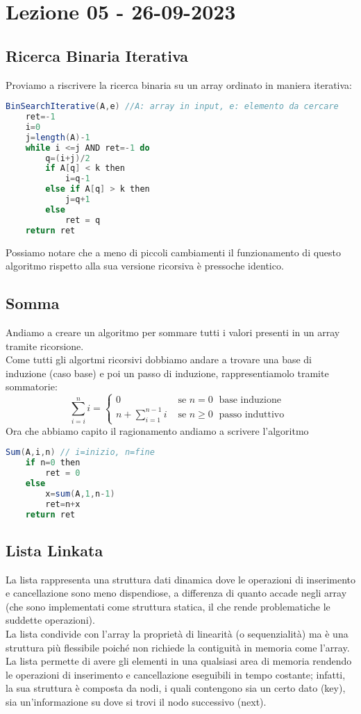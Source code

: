 \section{Lezione 05 - 26-09-2023}

\subsection{Ricerca Binaria Iterativa}
Proviamo a riscrivere la ricerca binaria su un array ordinato in maniera iterativa:
\begin{lstlisting}[language=Java]
BinSearchIterative(A,e) //A: array in input, e: elemento da cercare
	ret=-1
	i=0
	j=length(A)-1
	while i <=j AND ret=-1 do
		q=(i+j)/2
		if A[q] < k then
			i=q-1
		else if A[q] > k then
			j=q+1
		else 
			ret = q
	return ret
\end{lstlisting}
Possiamo notare che a meno di piccoli cambiamenti il funzionamento di questo algoritmo rispetto alla sua versione ricorsiva è pressoche identico.

\subsection{Somma}
Andiamo a creare un algoritmo per sommare tutti i valori presenti in un array tramite ricorsione.\\
Come tutti gli algortmi ricorsivi dobbiamo andare a trovare una base di induzione (caso base) e poi un passo di induzione, rappresentiamolo tramite sommatorie:
\begin{equation*}
 \sum_{i=i}^n i =
  \begin{cases}
  0 & \text{ se } n = 0 \; \text{ base induzione } \\
  n+\sum_{i=1}^{n-1}i & \text{ se } n \ge 0 \; \text{ passo induttivo }
  \end{cases}
\end{equation*}
Ora che abbiamo capito il ragionamento andiamo a scrivere l'algoritmo
\begin{lstlisting}[language=Java]
Sum(A,i,n) // i=inizio, n=fine
	if n=0 then
		ret = 0
	else
		x=sum(A,1,n-1)
		ret=n+x
	return ret
\end{lstlisting}

\newpage

\subsection{Lista Linkata}
La lista rappresenta una struttura dati dinamica dove le operazioni di inserimento e cancellazione sono meno dispendiose, a differenza di quanto accade negli array (che sono implementati come struttura statica, il che rende problematiche le suddette operazioni).\\
La lista condivide con l’array la proprietà di linearità (o sequenzialità) ma è una struttura più flessibile poiché non richiede la contiguità in memoria come l’array. La lista permette di avere gli elementi in una qualsiasi area di memoria rendendo le operazioni di inserimento e cancellazione eseguibili in tempo costante; infatti, la sua struttura è composta da nodi, i quali contengono sia un certo dato (key), sia un’informazione su dove si trovi il nodo successivo (next).

